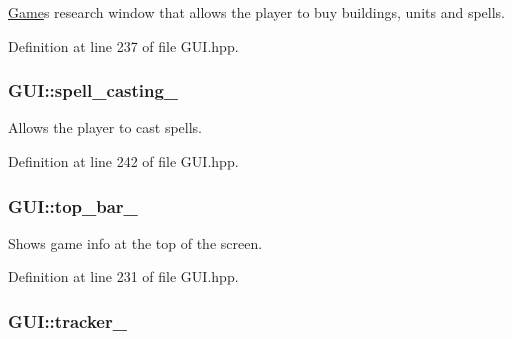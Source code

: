 \hyperlink{class_game}{Game}\textquotesingle{}s research window that allows the player to buy buildings, units and spells. 



Definition at line 237 of file G\+U\+I.\+hpp.

\subsubsection[{\texorpdfstring{spell\+\_\+casting\+\_\+}{spell_casting_}}]{ G\+U\+I\+::spell\+\_\+casting\+\_\+\hspace{0.3cm}{\ttfamily [private]}}\hypertarget{class_g_u_i_a434c351b8b781d7bf19dfbae30bc7d73}{}\label{class_g_u_i_a434c351b8b781d7bf19dfbae30bc7d73}


Allows the player to cast spells. 



Definition at line 242 of file G\+U\+I.\+hpp.

\subsubsection[{\texorpdfstring{top\+\_\+bar\+\_\+}{top_bar_}}]{ G\+U\+I\+::top\+\_\+bar\+\_\+\hspace{0.3cm}{\ttfamily [private]}}\hypertarget{class_g_u_i_a6de1adcb5f3b762f3f99e7b37db61740}{}\label{class_g_u_i_a6de1adcb5f3b762f3f99e7b37db61740}


Shows game info at the top of the screen. 



Definition at line 231 of file G\+U\+I.\+hpp.

\subsubsection[{\texorpdfstring{tracker\+\_\+}{tracker_}}]{ G\+U\+I\+::tracker\+\_\+\hspace{0.3cm}{\ttfamily [private]}}\hypertarget{class_g_u_i_a90c490c7ff853531ac635f08408d59bf}{}\label{class_g_u_i_a90c490c7ff853531ac635f08408d59bf}


